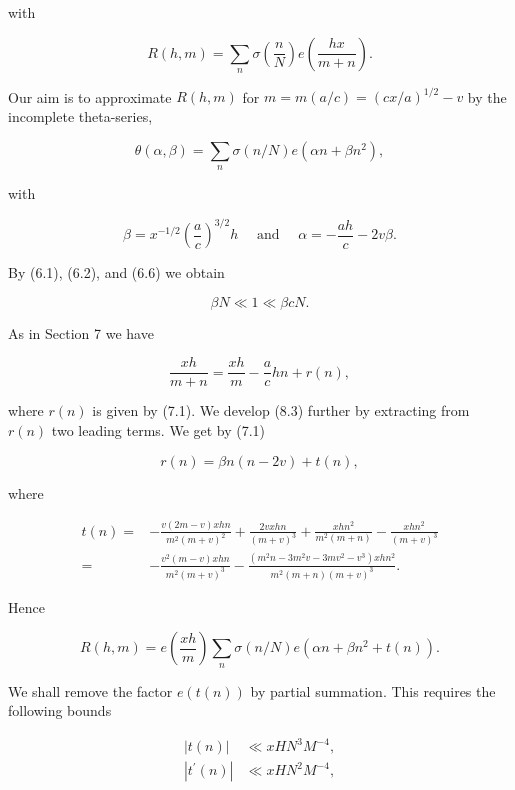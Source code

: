 \documentclass[10pt]{article}
\begin{document}
with

$$
R(h, m)=\sum_{n} \sigma\left(\frac{n}{N}\right) e\left(\frac{h x}{m+n}\right) .
$$

Our aim is to approximate $R(h, m)$ for $m=m(a / c)=(c x / a)^{1 / 2}-v$ by the incomplete theta-series,

$$
\theta(\alpha, \beta)=\sum_{n} \sigma(n / N) e\left(\alpha n+\beta n^{2}\right),
$$

with


\begin{equation*}
\beta=x^{-1 / 2}\left(\frac{a}{c}\right)^{3 / 2} h \quad \text { and } \quad \alpha=-\frac{a h}{c}-2 v \beta . \tag{8.1}
\end{equation*}


By (6.1), (6.2), and (6.6) we obtain


\begin{equation*}
\beta N \ll 1 \ll \beta c N . \tag{8.2}
\end{equation*}


As in Section 7 we have


\begin{equation*}
\frac{x h}{m+n}=\frac{x h}{m}-\frac{a}{c} h n+r(n), \tag{8.3}
\end{equation*}


where $r(n)$ is given by (7.1). We develop (8.3) further by extracting from $r(n)$ two leading terms. We get by (7.1)

$$
r(n)=\beta n(n-2 v)+t(n),
$$

where

$$
\begin{aligned}
t(n)={}&-\frac{v(2m-v)xhn}{m^{2}(m+v)^{2}}
       +\frac{2vxhn}{(m+v)^{3}}
       +\frac{xhn^{2}}{m^{2}(m+n)}
       -\frac{xhn^{2}}{(m+v)^{3}} \\
={}&-\frac{v^{2}(m-v)xhn}{m^{2}(m+v)^{3}}
    -\frac{(m^{2}n-3m^{2}v-3mv^{2}-v^{3})xhn^{2}}
           {m^{2}(m+n)(m+v)^{3}}.
\end{aligned}
$$

Hence

$$
R(h, m)=e\left(\frac{x h}{m}\right) \sum_{n} \sigma(n / N) e\left(\alpha n+\beta n^{2}+t(n)\right) .
$$

We shall remove the factor $e(t(n))$ by partial summation. This requires the following bounds

$$
\begin{aligned}
|t(n)| & \ll xHN^{3}M^{-4}, \\
|t^{\prime}(n)| & \ll xHN^{2}M^{-4},
\end{aligned}
$$
\end{document}
